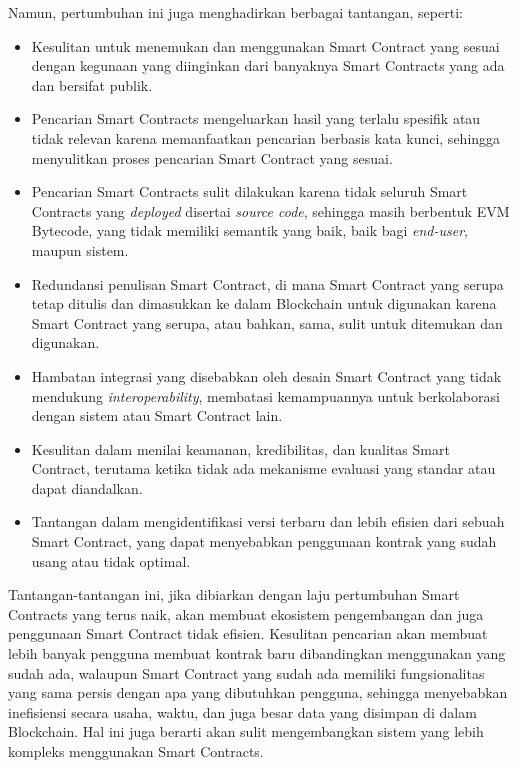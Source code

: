 Namun, pertumbuhan ini juga menghadirkan berbagai tantangan, seperti:
\begin{itemize}
    \item Kesulitan untuk menemukan dan menggunakan Smart Contract yang sesuai dengan kegunaan yang diinginkan dari banyaknya Smart Contracts yang ada dan bersifat publik.
    \item Pencarian Smart Contracts mengeluarkan hasil yang terlalu spesifik atau tidak relevan karena memanfaatkan pencarian berbasis kata kunci, sehingga menyulitkan proses pencarian Smart Contract yang sesuai.
    \item Pencarian Smart Contracts sulit dilakukan karena tidak seluruh Smart Contracts yang \textit{deployed} disertai \textit{source code}, sehingga masih berbentuk EVM Bytecode, yang tidak memiliki semantik yang baik, baik bagi \textit{end-user}, maupun sistem. 
    \item Redundansi penulisan Smart Contract, di mana Smart Contract yang serupa tetap ditulis dan dimasukkan ke dalam Blockchain untuk digunakan karena Smart Contract yang serupa, atau bahkan, sama, sulit untuk ditemukan dan digunakan.
    \item Hambatan integrasi yang disebabkan oleh desain Smart Contract yang tidak mendukung \textit{interoperability}, membatasi kemampuannya untuk berkolaborasi dengan sistem atau Smart Contract lain.
    \item Kesulitan dalam menilai keamanan, kredibilitas, dan kualitas Smart Contract, terutama ketika tidak ada mekanisme evaluasi yang standar atau dapat diandalkan.
    \item Tantangan dalam mengidentifikasi versi terbaru dan lebih efisien dari sebuah Smart Contract, yang dapat menyebabkan penggunaan kontrak yang sudah usang atau tidak optimal.
\end{itemize}

Tantangan-tantangan ini, jika dibiarkan dengan laju pertumbuhan Smart Contracts yang terus naik, akan membuat ekosistem pengembangan dan juga penggunaan Smart Contract tidak efisien. Kesulitan pencarian akan membuat lebih banyak pengguna membuat kontrak baru dibandingkan menggunakan yang sudah ada, walaupun Smart Contract yang sudah ada memiliki fungsionalitas yang sama persis dengan apa yang dibutuhkan pengguna, sehingga menyebabkan inefisiensi secara usaha, waktu, dan juga besar data yang disimpan di dalam Blockchain. Hal ini juga berarti akan sulit mengembangkan sistem yang lebih kompleks menggunakan Smart Contracts.

